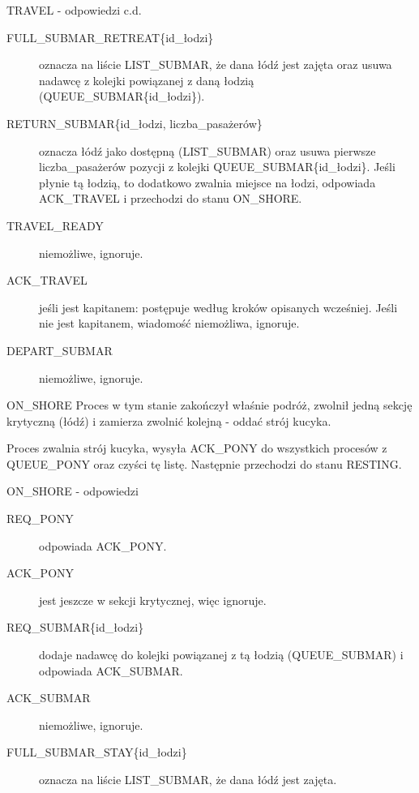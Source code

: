 \documentclass{beamer}
\begin{document}
\begin{frame}{TRAVEL - odpowiedzi c.d.}
    \internallinenumbers
    \resetlinenumber[1]
    \begin{description}
        \item [FULL\_SUBMAR\_RETREAT\{id\_łodzi\}] oznacza na liście LIST\_SUBMAR, że dana łódź jest zajęta oraz usuwa nadawcę z kolejki powiązanej z daną łodzią (QUEUE\_SUBMAR\{id\_łodzi\}).
        \item [RETURN\_SUBMAR\{id\_łodzi, liczba\_pasażerów\}] oznacza łódź jako dostępną (LIST\_SUBMAR) oraz usuwa pierwsze liczba\_pasażerów pozycji z kolejki QUEUE\_SUBMAR\{id\_łodzi\}. Jeśli płynie tą łodzią, to dodatkowo zwalnia miejsce na łodzi, odpowiada ACK\_TRAVEL i przechodzi do stanu ON\_SHORE.
        \item [TRAVEL\_READY] niemożliwe, ignoruje.
        \item [ACK\_TRAVEL] jeśli jest kapitanem: postępuje według kroków opisanych wcześniej. Jeśli nie jest kapitanem, wiadomość niemożliwa, ignoruje.
        \item [DEPART\_SUBMAR] niemożliwe, ignoruje.
    \end{description}
\end{frame}

\begin{frame}{ON\_SHORE}
    \internallinenumbers
    \resetlinenumber[1]
    Proces w tym stanie zakończył właśnie podróż, zwolnił jedną sekcję krytyczną (łódź) i zamierza zwolnić kolejną - oddać strój kucyka.
    
    \vspace{0.4cm}
    Proces zwalnia strój kucyka, wysyła ACK\_PONY do wszystkich procesów z QUEUE\_PONY oraz czyści tę listę. Następnie przechodzi do stanu RESTING.
\end{frame}

\begin{frame}{ON\_SHORE - odpowiedzi}
    \internallinenumbers
    \resetlinenumber[1]
    \begin{description}
        \item [REQ\_PONY] odpowiada ACK\_PONY.
        \item [ACK\_PONY] jest jeszcze w sekcji krytycznej, więc ignoruje.
        \item [REQ\_SUBMAR\{id\_łodzi\}] dodaje nadawcę do kolejki powiązanej z tą łodzią (QUEUE\_SUBMAR) i odpowiada ACK\_SUBMAR.
        \item [ACK\_SUBMAR] niemożliwe, ignoruje.
        \item [FULL\_SUBMAR\_STAY\{id\_łodzi\}] oznacza na liście LIST\_SUBMAR, że dana łódź jest zajęta.
    \end{description}
\end{frame}
\end{document}
